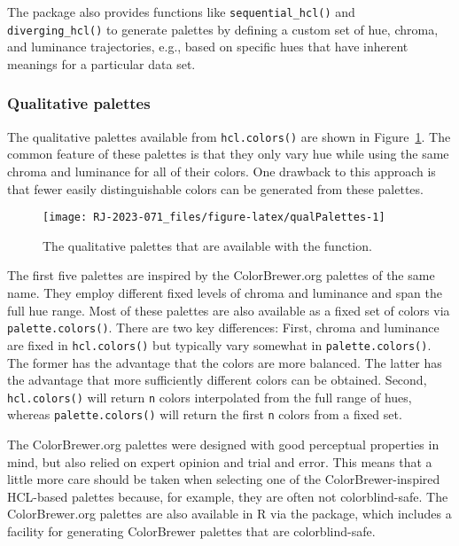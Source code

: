 The  package also provides functions like
\texttt{sequential\_hcl()} and \texttt{diverging\_hcl()}
to generate palettes by defining a custom set of
hue, chroma, and luminance
trajectories, e.g., based on specific hues that have inherent meanings
for a particular data set.

\hypertarget{qualitative-palettes}{%
\subsubsection{Qualitative palettes}\label{qualitative-palettes}}

The qualitative palettes available from \texttt{hcl.colors()} are shown
in Figure~\ref{fig:qualPalettes}.
The common feature of these palettes is that they only vary hue
while using the same chroma and luminance for all of their colors.
One drawback to this approach is that fewer easily distinguishable
colors can be generated from these palettes.

\begin{figure}[ht!]

{\centering \texttt{[image: RJ-2023-071\_files/figure-latex/qualPalettes-1]} 

}

\caption{The qualitative palettes that are available with the  function.}\label{fig:qualPalettes}
\end{figure}

The first five palettes are inspired by the ColorBrewer.org
palettes of the same name.
They employ different fixed levels of chroma and luminance and
span the full hue range.
Most of these palettes are also available as a fixed set
of colors via \texttt{palette.colors()}. There are two key differences:
First, chroma and luminance are fixed in \texttt{hcl.colors()} but typically
vary somewhat in \texttt{palette.colors()}. The former has the advantage
that the colors are more balanced. The latter has the advantage
that more sufficiently different colors can be obtained. Second,
\texttt{hcl.colors()} will return \texttt{n} colors interpolated from the full
range of hues, whereas \texttt{palette.colors()} will return the first \texttt{n}
colors from a fixed set.

The ColorBrewer.org palettes were designed with good perceptual properties
in mind, but also relied on expert opinion and trial and error.
This means that a little more care should be taken when selecting one
of the ColorBrewer-inspired HCL-based palettes because, for example,
they are often not colorblind-safe.
The ColorBrewer.org palettes are also available in R via the
 package, which includes a facility for
generating ColorBrewer palettes that are colorblind-safe.

